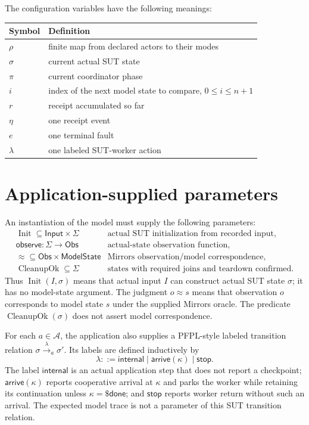 \documentclass{article}
\newcommand{\State}{\Sigma}
\newcommand{\Obs}{\mathsf{Obs}}
\newcommand{\Model}{\mathsf{ModelState}}
\newcommand{\Input}{\mathsf{Input}}
\newcommand{\CPDone}{\mathsf{\$done}}
\newcommand{\Internal}{\mathsf{internal}}
\newcommand{\Stop}{\mathsf{stop}}
\newcommand{\observe}{\mathsf{observe}}
\newcommand{\matches}{\approx}
\begin{document}
The configuration variables have the following meanings:
\begin{center}
\begin{tabular}{ll}
  Symbol & Definition\\ \hline
  $\rho$ & finite map from declared actors to their modes\\
  $\sigma$ & current actual SUT state\\
  $\pi$ & current coordinator phase\\
  $i$ & index of the next model state to compare, $0\le i\le n+1$\\
  $r$ & receipt accumulated so far\\
  $\eta$ & one receipt event\\
  $e$ & one terminal fault\\
  $\lambda$ & one labeled SUT-worker action
\end{tabular}
\end{center}

\section{Application-supplied parameters}
\label{sec:app-parameters}

An instantiation of the model must supply the following parameters:
\[
\begin{array}{ll}
  \operatorname{Init}\subseteq\Input\times\State
    & \text{actual SUT initialization from recorded input},\\
  \observe:\State\to\Obs
    & \text{actual-state observation function},\\
  {\matches}\subseteq\Obs\times\Model
    & \text{Mirrors observation/model correspondence},\\
  \operatorname{CleanupOk}\subseteq\State
    & \text{states with required joins and teardown confirmed}.
\end{array}
\]
Thus $\operatorname{Init}(I,\sigma)$ means that actual input $I$ can construct
actual SUT state $\sigma$; it has no model-state argument. The judgment
$o\matches s$ means that observation $o$ corresponds to model state $s$ under
the supplied Mirrors oracle. The predicate $\operatorname{CleanupOk}(\sigma)$
does not assert model correspondence.

For each $a\in\mathcal A$, the application also supplies a PFPL-style labeled
transition relation $\sigma\xrightarrow{\lambda}_{a}\sigma'$. Its labels are
defined inductively by
\[
  \lambda::=\Internal\mid\mathsf{arrive}(\kappa)\mid\Stop .
\]
The label $\Internal$ is an actual application step that does not report a
checkpoint; $\mathsf{arrive}(\kappa)$ reports cooperative arrival at $\kappa$
and parks the worker while retaining its continuation unless
$\kappa=\CPDone$; and $\Stop$ reports worker return without such an arrival.
The expected model trace is not a parameter of this SUT transition relation.
\end{document}
